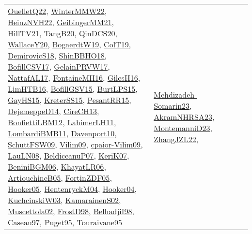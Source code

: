 {\begin{longtable}{llp{6cm}p{6cm}p{6cm}}
\href{papers/OuelletQ22.pdf}{OuelletQ22}\cite{OuelletQ22}, \href{papers/WinterMMW22.pdf}{WinterMMW22}\cite{WinterMMW22}, \href{articles/HeinzNVH22.pdf}{HeinzNVH22}\cite{HeinzNVH22}, \href{papers/GeibingerMM21.pdf}{GeibingerMM21}\cite{GeibingerMM21}, \href{papers/HillTV21.pdf}{HillTV21}\cite{HillTV21}, \href{papers/TangB20.pdf}{TangB20}\cite{TangB20}, \href{articles/QinDCS20.pdf}{QinDCS20}\cite{QinDCS20}, \href{articles/WallaceY20.pdf}{WallaceY20}\cite{WallaceY20}, \href{papers/BogaerdtW19.pdf}{BogaerdtW19}\cite{BogaerdtW19}, \href{papers/ColT19.pdf}{ColT19}\cite{ColT19}, \href{papers/DemirovicS18.pdf}{DemirovicS18}\cite{DemirovicS18}, \href{articles/ShinBBHO18.pdf}{ShinBBHO18}\cite{ShinBBHO18}, \href{papers/BofillCSV17.pdf}{BofillCSV17}\cite{BofillCSV17}, \href{papers/GelainPRVW17.pdf}{GelainPRVW17}\cite{GelainPRVW17}, \href{articles/NattafAL17.pdf}{NattafAL17}\cite{NattafAL17}, \href{papers/FontaineMH16.pdf}{FontaineMH16}\cite{FontaineMH16}, \href{papers/GilesH16.pdf}{GilesH16}\cite{GilesH16}, \href{papers/LimHTB16.pdf}{LimHTB16}\cite{LimHTB16}, \href{papers/BofillGSV15.pdf}{BofillGSV15}\cite{BofillGSV15}, \href{papers/BurtLPS15.pdf}{BurtLPS15}\cite{BurtLPS15}, \href{papers/GayHS15.pdf}{GayHS15}\cite{GayHS15}, \href{papers/KreterSS15.pdf}{KreterSS15}\cite{KreterSS15}, \href{papers/PesantRR15.pdf}{PesantRR15}\cite{PesantRR15}, \href{papers/DejemeppeD14.pdf}{DejemeppeD14}\cite{DejemeppeD14}, \href{papers/CireCH13.pdf}{CireCH13}\cite{CireCH13}, \href{papers/BonfiettiLBM12.pdf}{BonfiettiLBM12}\cite{BonfiettiLBM12}, \href{papers/LahimerLH11.pdf}{LahimerLH11}\cite{LahimerLH11}, \href{papers/LombardiBMB11.pdf}{LombardiBMB11}\cite{LombardiBMB11}, \href{papers/Davenport10.pdf}{Davenport10}\cite{Davenport10}, \href{papers/SchuttFSW09.pdf}{SchuttFSW09}\cite{SchuttFSW09}, \href{papers/Vilim09.pdf}{Vilim09}\cite{Vilim09}, \href{papers/cpaior-Vilim09.pdf}{cpaior-Vilim09}\cite{cpaior-Vilim09}, \href{papers/LauLN08.pdf}{LauLN08}\cite{LauLN08}, \href{papers/BeldiceanuP07.pdf}{BeldiceanuP07}\cite{BeldiceanuP07}, \href{papers/KeriK07.pdf}{KeriK07}\cite{KeriK07}, \href{papers/BeniniBGM06.pdf}{BeniniBGM06}\cite{BeniniBGM06}, \href{articles/KhayatLR06.pdf}{KhayatLR06}\cite{KhayatLR06}, \href{papers/ArtiouchineB05.pdf}{ArtiouchineB05}\cite{ArtiouchineB05}, \href{papers/FortinZDF05.pdf}{FortinZDF05}\cite{FortinZDF05}, \href{articles/Hooker05.pdf}{Hooker05}\cite{Hooker05}, \href{papers/HentenryckM04.pdf}{HentenryckM04}\cite{HentenryckM04}, \href{papers/Hooker04.pdf}{Hooker04}\cite{Hooker04}, \href{articles/KuchcinskiW03.pdf}{KuchcinskiW03}\cite{KuchcinskiW03}, \href{papers/KamarainenS02.pdf}{KamarainenS02}\cite{KamarainenS02}, \href{papers/Muscettola02.pdf}{Muscettola02}\cite{Muscettola02}, \href{papers/FrostD98.pdf}{FrostD98}\cite{FrostD98}, \href{articles/BelhadjiI98.pdf}{BelhadjiI98}\cite{BelhadjiI98}, \href{papers/Caseau97.pdf}{Caseau97}\cite{Caseau97}, \href{papers/Puget95.pdf}{Puget95}\cite{Puget95}, \href{papers/Touraivane95.pdf}{Touraivane95}\cite{Touraivane95} & \href{papers/Mehdizadeh-Somarin23.pdf}{Mehdizadeh-Somarin23}\cite{Mehdizadeh-Somarin23}, \href{articles/AkramNHRSA23.pdf}{AkramNHRSA23}\cite{AkramNHRSA23}, \href{articles/MontemanniD23.pdf}{MontemanniD23}\cite{MontemanniD23}, \href{papers/ZhangJZL22.pdf}{ZhangJZL22}\cite{ZhangJZL22}, 
\end{longtable}}
